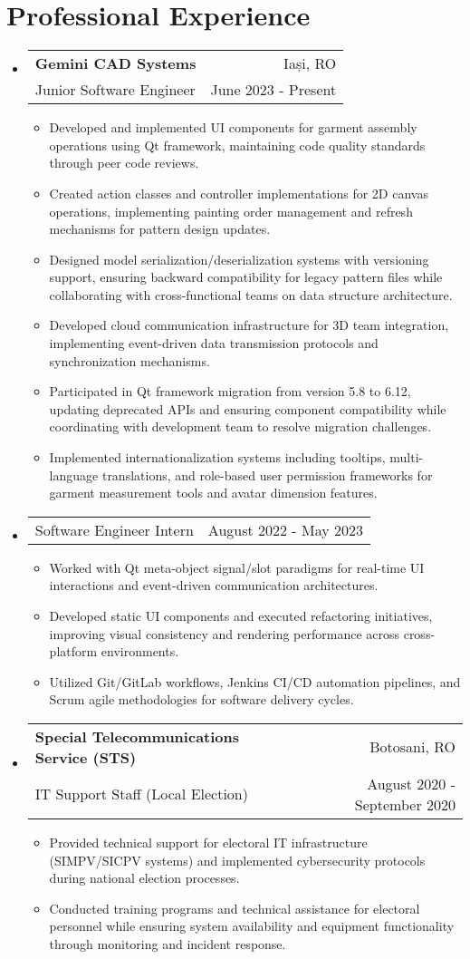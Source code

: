 \documentclass[a4paper,11pt]{article}
\makeatletter
\newcommand{\resumeItem}[1]{\item\small{#1\vspace{-2pt}}}
\newcommand{\resumeSubheading}[4]{
  \vspace{-1pt}\item
    \begin{tabular*}{0.97\textwidth}{l@{\extracolsep{\fill}}r}
      \color{NavyBlue}\textbf{#1} & #2 \\
      #3 & #4 \\
    \end{tabular*}\vspace{-5pt}
}
\newcommand{\resumeSubheadingSimple}[2]{
  \vspace{-1pt}\item
    \begin{tabular*}{0.97\textwidth}{l@{\extracolsep{\fill}}r}
      #1 & #2 \\
    \end{tabular*}\vspace{-5pt}
}
\newcommand{\resumeSubHeadingListStart}{\begin{itemize}[leftmargin=*, label={}]}
\newcommand{\resumeSubHeadingListEnd}{\end{itemize}}
\newcommand{\resumeItemListStart}{\begin{itemize}}
\newcommand{\resumeItemListEnd}{\end{itemize}\vspace{-5pt}}
\makeatother
\begin{document}
\section{Professional Experience}
  \resumeSubHeadingListStart
    \resumeSubheading{Gemini CAD Systems}{Iași, RO}
    {Junior Software Engineer}{June 2023 - Present}
    \resumeItemListStart
        \resumeItem{Developed and implemented UI components for garment assembly operations using Qt framework, maintaining code quality standards through peer code reviews.}
        \resumeItem{Created action classes and controller implementations for 2D canvas operations, implementing painting order management and refresh mechanisms for pattern design updates.}
        \resumeItem{Designed model serialization/deserialization systems with versioning support, ensuring backward compatibility for legacy pattern files while collaborating with cross-functional teams on data structure architecture.}
        \resumeItem{Developed cloud communication infrastructure for 3D team integration, implementing event-driven data transmission protocols and synchronization mechanisms.}
        \resumeItem{Participated in Qt framework migration from version 5.8 to 6.12, updating deprecated APIs and ensuring component compatibility while coordinating with development team to resolve migration challenges.}
        \resumeItem{Implemented internationalization systems including tooltips, multi-language translations, and role-based user permission frameworks for garment measurement tools and avatar dimension features.}
    \resumeItemListEnd
    \resumeSubheadingSimple
    {Software Engineer Intern}{August 2022 - May 2023}
    \resumeItemListStart
        \resumeItem{Worked with Qt meta-object signal/slot paradigms for real-time UI interactions and event-driven communication architectures.}
        \resumeItem{Developed static UI components and executed refactoring initiatives, improving visual consistency and rendering performance across cross-platform environments.}
        \resumeItem{Utilized Git/GitLab workflows, Jenkins CI/CD automation pipelines, and Scrum agile methodologies for software delivery cycles.}
    \resumeItemListEnd
    \resumeSubheading{Special Telecommunications Service (STS)}{Botosani, RO}
    {IT Support Staff (Local Election)}{August 2020 - September 2020}
    \resumeItemListStart
         \resumeItem{Provided technical support for electoral IT infrastructure (SIMPV/SICPV systems) and implemented cybersecurity protocols during national election processes.}
        \resumeItem{Conducted training programs and technical assistance for electoral personnel while ensuring system availability and equipment functionality through monitoring and incident response.}
    \resumeItemListEnd
\resumeSubHeadingListEnd
\end{document}
